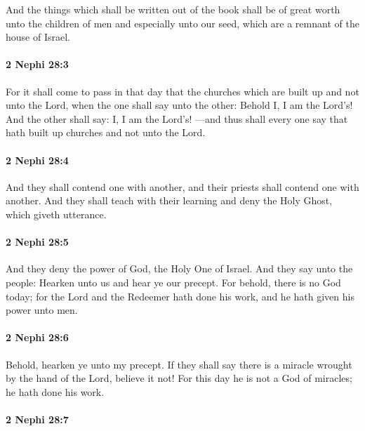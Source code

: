 			And the things which shall be written out of the book
			shall be of great worth unto the children of men
			and especially unto our seed, which are a remnant of the house of Israel.

		\paragraph{2 Nephi 28:3} %
			\label{2NEPHI-28-3}

			For it shall come to pass in that day
			that the churches which are built up and not unto the Lord,
			when the one shall say unto the other:
			Behold I, I am the Lord's!
			And the other shall say:
			I, I am the Lord's!
			---and thus shall every one say
			that hath built up churches and not unto the Lord.

		\paragraph{2 Nephi 28:4} %
			\label{2NEPHI-28-4}

			And they shall contend one with another,
			and their priests shall contend one with another.
			And they shall teach with their learning
			and deny the Holy Ghost, which giveth utterance.

		\paragraph{2 Nephi 28:5} %
			\label{2NEPHI-28-5}

			And they deny the power of God, the Holy One of Israel.
			And they say unto the people:
			Hearken unto us and hear ye our precept.
			For behold, there is no God today;
			for the Lord and the Redeemer hath done his work,
			and he hath given his power unto men.

		\paragraph{2 Nephi 28:6} %
			\label{2NEPHI-28-6}

			Behold, hearken ye unto my precept.
			If they shall say there is a miracle wrought by the hand of the Lord,
			believe it not!
			For this day he is not a God of miracles;
			he hath done his work.

		\paragraph{2 Nephi 28:7} %
			\label{2NEPHI-28-7}


